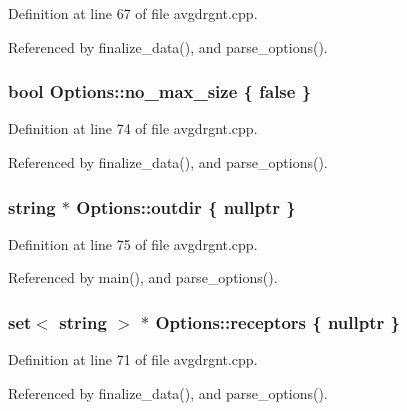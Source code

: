 Definition at line 67 of file avgdrgnt.\+cpp.



Referenced by finalize\+\_\+data(), and parse\+\_\+options().

\subsubsection[{\texorpdfstring{no\+\_\+max\+\_\+size}{no_max_size}}]{\setlength{\rightskip}{0pt plus 5cm}bool Options\+::no\+\_\+max\+\_\+size \{ false \}}\hypertarget{structOptions_a8ad3707dd08d31b9084188a549126644}{}\label{structOptions_a8ad3707dd08d31b9084188a549126644}


Definition at line 74 of file avgdrgnt.\+cpp.



Referenced by finalize\+\_\+data(), and parse\+\_\+options().

\subsubsection[{\texorpdfstring{outdir}{outdir}}]{\setlength{\rightskip}{0pt plus 5cm}string $\ast$ Options\+::outdir \{ nullptr \}}\hypertarget{structOptions_a80746ce696086f5fb130d798849d0277}{}\label{structOptions_a80746ce696086f5fb130d798849d0277}


Definition at line 75 of file avgdrgnt.\+cpp.



Referenced by main(), and parse\+\_\+options().

\subsubsection[{\texorpdfstring{receptors}{receptors}}]{\setlength{\rightskip}{0pt plus 5cm}set$<$ string $>$ $\ast$ Options\+::receptors \{ nullptr \}}\hypertarget{structOptions_a4192410864fec99db1eea65c8d8dfb52}{}\label{structOptions_a4192410864fec99db1eea65c8d8dfb52}


Definition at line 71 of file avgdrgnt.\+cpp.



Referenced by finalize\+\_\+data(), and parse\+\_\+options().

